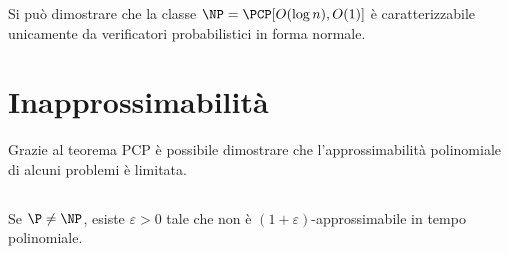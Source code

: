 Si può dimostrare che la classe $\NP=\PCP[O(\log n),O(1)]$ è caratterizzabile unicamente da verificatori probabilistici in forma normale.



\section{Inapprossimabilità}
Grazie al teorema PCP è possibile dimostrare che l'approssimabilità polinomiale di alcuni problemi è limitata.


\subsection{\MaxSat}
\begin{theorem}
	Se $\P\neq\NP$, esiste $\varepsilon>0$ tale che \MaxSat non è $(1+\varepsilon)$-approssimabile in tempo polinomiale.
\end{theorem}
